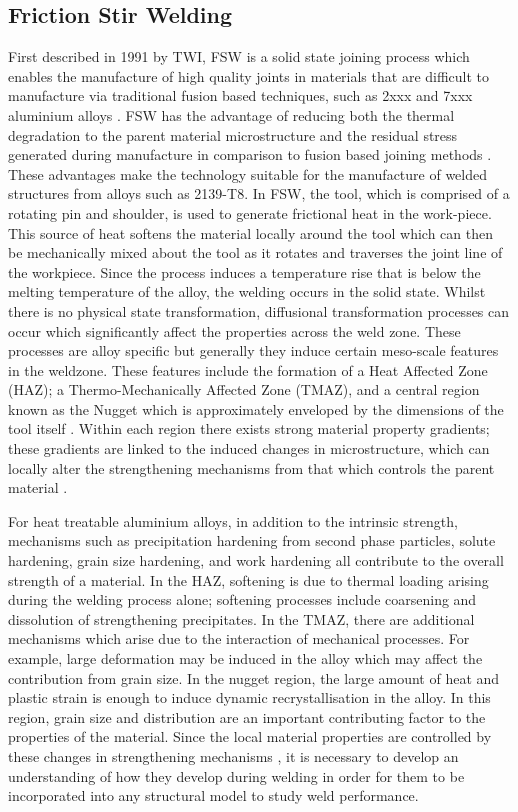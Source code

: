 \subsection{Friction Stir Welding}
\label{IntroFSW}
First described in 1991 by TWI, FSW is a solid state joining process which enables the manufacture of high quality joints in materials that are difficult to manufacture via traditional fusion based techniques, such as 2xxx and 7xxx aluminium alloys \cite{Karlsson2000,Peel2003}.  FSW has the advantage of reducing both the thermal degradation to the parent material microstructure and the residual stress generated during manufacture in comparison to fusion based joining methods \cite{Mishra2005}. These advantages make the technology suitable for the manufacture of welded structures from alloys such as 2139-T8. 
In FSW, the tool, which is comprised of a rotating pin and shoulder, is used to generate frictional heat in the work-piece. This source of heat softens the material locally around the tool which can then be mechanically mixed about the tool as it rotates and traverses the joint line of the workpiece. Since the process induces a temperature rise that is below the melting temperature of the alloy, the welding occurs in the solid state. 
Whilst there is no physical state transformation, diffusional transformation processes can occur which significantly affect the properties across the weld zone. These processes are alloy specific but generally they induce certain meso-scale features in the weldzone. These features include the formation of a Heat Affected Zone (HAZ); a Thermo-Mechanically Affected Zone (TMAZ), and a central region known as the Nugget which is approximately enveloped by the dimensions of the tool itself \cite{Mishra2005}. Within each region there exists strong material property gradients; these gradients are linked to the induced changes in microstructure, which can locally alter the strengthening mechanisms from that which controls the parent material \cite{Su2003,Mahoney1998}. 

For heat treatable aluminium alloys, in addition to the intrinsic strength, mechanisms such as precipitation hardening from second phase particles, solute hardening, grain size hardening, and work hardening all contribute to the overall strength of a material. In the HAZ, softening is due to thermal loading arising during the welding process alone; softening processes include coarsening and dissolution of strengthening precipitates. In the TMAZ, there are additional mechanisms which arise due to the interaction of mechanical processes. For example, large deformation may be induced in the alloy which may affect the contribution from grain size. In the nugget region, the large amount of heat and plastic strain is enough to induce dynamic recrystallisation in the alloy. In this region, grain size and distribution are an important contributing factor to the properties of the material. Since the local material properties are controlled by these changes in strengthening mechanisms \cite{Karlsson2000}, it is necessary to develop an understanding of how they develop during welding in order for them to be incorporated into any structural model to study weld performance.

